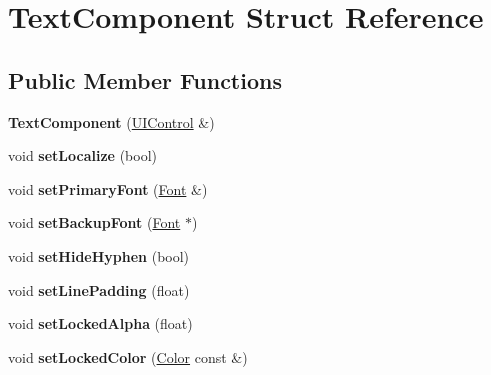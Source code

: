\hypertarget{struct_text_component}{}\section{Text\+Component Struct Reference}
\label{struct_text_component}
\subsection*{Public Member Functions}
\begin{DoxyCompactItemize}
\item 
\mbox{\label{struct_text_component_a9bbbcd2b92e9cce1562d3ba2e719a8df}} 
{\bfseries Text\+Component} (\mbox{\hyperlink{struct_u_i_control}{U\+I\+Control}} \&)
\item 
\mbox{\label{struct_text_component_ab0215e1153314e7c4ec28503989c30af}} 
void {\bfseries set\+Localize} (bool)
\item 
\mbox{\label{struct_text_component_a967d91ca05e0098106646c2eb3e5f6ee}} 
void {\bfseries set\+Primary\+Font} (\mbox{\hyperlink{struct_font}{Font}} \&)
\item 
\mbox{\label{struct_text_component_abe59d8867197e6b41f1f8a39f7cfc191}} 
void {\bfseries set\+Backup\+Font} (\mbox{\hyperlink{struct_font}{Font}} $\ast$)
\item 
\mbox{\label{struct_text_component_af5b616c9dd374c5f23347e7a86a41dcc}} 
void {\bfseries set\+Hide\+Hyphen} (bool)
\item 
\mbox{\label{struct_text_component_ac4bfe99a14c74a0f764978e5f891e421}} 
void {\bfseries set\+Line\+Padding} (float)
\item 
\mbox{\label{struct_text_component_a799ee06870bb042609768d35c98755d6}} 
void {\bfseries set\+Locked\+Alpha} (float)
\item 
\mbox{\label{struct_text_component_ad8a9c99a568b36db291c255fed40f71b}} 
void {\bfseries set\+Locked\+Color} (\mbox{\hyperlink{struct_color}{Color}} const \&)
\item 

\end{DoxyCompactItemize}

